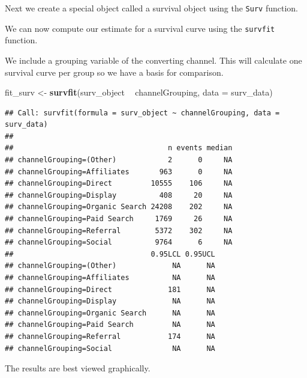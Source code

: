 \documentclass[]{book}
\newenvironment{Shaded}{\begin{snugshade}}{\end{snugshade}}
\newcommand{\DataTypeTok}[1]{\textcolor[rgb]{0.13,0.29,0.53}{#1}}
\newcommand{\KeywordTok}[1]{\textcolor[rgb]{0.13,0.29,0.53}{\textbf{#1}}}
\newcommand{\NormalTok}[1]{#1}
\newcommand{\OperatorTok}[1]{\textcolor[rgb]{0.81,0.36,0.00}{\textbf{#1}}}
\newcommand{\StringTok}[1]{\textcolor[rgb]{0.31,0.60,0.02}{#1}}
\begin{document}
Next we create a special object called a survival object using the \texttt{Surv} function.

\begin{Shaded}
\end{Shaded}

We can now compute our estimate for a survival curve using the \texttt{survfit} function.

We include a grouping variable of the converting channel. This will calculate
one survival curve per group so we have a basis for comparison.

\begin{Shaded}
\begin{Highlighting}[]
\NormalTok{fit_surv <-}\StringTok{ }\KeywordTok{survfit}\NormalTok{(surv_object }\OperatorTok{~}\StringTok{ }\NormalTok{channelGrouping, }\DataTypeTok{data =}\NormalTok{ surv_data)}
\end{Highlighting}
\end{Shaded}

\begin{verbatim}
## Call: survfit(formula = surv_object ~ channelGrouping, data = surv_data)
## 
##                                    n events median
## channelGrouping=(Other)            2      0     NA
## channelGrouping=Affiliates       963      0     NA
## channelGrouping=Direct         10555    106     NA
## channelGrouping=Display          408     20     NA
## channelGrouping=Organic Search 24208    202     NA
## channelGrouping=Paid Search     1769     26     NA
## channelGrouping=Referral        5372    302     NA
## channelGrouping=Social          9764      6     NA
##                                0.95LCL 0.95UCL
## channelGrouping=(Other)             NA      NA
## channelGrouping=Affiliates          NA      NA
## channelGrouping=Direct             181      NA
## channelGrouping=Display             NA      NA
## channelGrouping=Organic Search      NA      NA
## channelGrouping=Paid Search         NA      NA
## channelGrouping=Referral           174      NA
## channelGrouping=Social              NA      NA
\end{verbatim}

The results are best viewed graphically.
\end{document}
